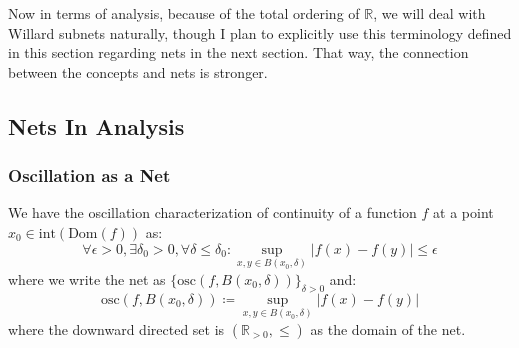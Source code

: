 \documentclass[10pt,letterpaper]{article} %
\begin{document}
Now in terms of analysis, because of the total ordering of $\mathbb{R}$, we will deal with Willard subnets naturally, though I plan to explicitly use this terminology defined in this section regarding nets in the next section. That way, the connection between the concepts and nets is stronger.

\subsection{Nets In Analysis}
\subsubsection{Oscillation as a Net}
We have the oscillation characterization of continuity of a function $f$ at a point $x_0 \in \text{int}(\text{Dom}(f))$ as:
\begin{equation*}
\forall \epsilon > 0, \exists \delta_0 > 0, \forall \delta \leqslant \delta_0: \sup_{x, y \in B(x_0, \delta)}|f(x) - f(y)| \leqslant \epsilon
\end{equation*}
where we write the net as $\{\text{osc}(f, B(x_0, \delta))\}_{\delta > 0}$ and:
\begin{equation*}
\text{osc}(f, B(x_0, \delta)) \coloneq \sup_{x, y \in B(x_0, \delta)}|f(x) - f(y)|
\end{equation*}
where the downward directed set is $(\mathbb{R}_{> 0}, \leqslant)$ as the domain of the net.\\
\end{document}
